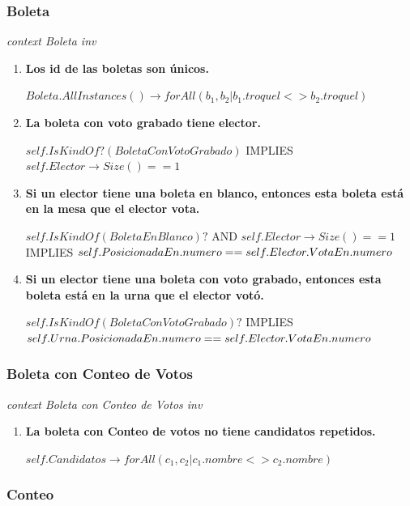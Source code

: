 \subsubsection*{Boleta}

\textit{context Boleta
inv}

\begin{enumerate}

\item \textbf{Los id de las boletas son únicos.}

$Boleta.AllInstances() \rightarrow forAll(b_1, b_2 | b_1.troquel <> b_2.troquel)$

\item \textbf{La boleta con voto grabado tiene elector.}

$self.IsKindOf?(BoletaConVotoGrabado)$  IMPLIES  $self.Elector \rightarrow Size() == 1 $

\item \textbf{Si un elector tiene una boleta en blanco, entonces esta boleta está en la mesa que el elector vota.}

$self.IsKindOf(BoletaEnBlanco)?$ AND $self.Elector \rightarrow Size() == 1 $ IMPLIES $\\
self.PosicionadaEn.numero == self.Elector.VotaEn.numero$

\item \textbf{Si un elector tiene una boleta con voto grabado, entonces esta boleta está en la urna que el elector vot\'o.}

$self.IsKindOf(BoletaConVotoGrabado)? $  IMPLIES  $\\
self.Urna.PosicionadaEn.numero == self.Elector.VotaEn.numero$

\end{enumerate}

\subsubsection*{Boleta con Conteo de Votos}

\textit{context Boleta con Conteo de Votos
inv}

\begin{enumerate}
\item \textbf{La boleta con Conteo de votos no tiene candidatos repetidos.}

$self.Candidatos \rightarrow forAll(c_1, c_2| c_1.nombre <> c_2.nombre)$

\end{enumerate}
\subsubsection*{Conteo}

